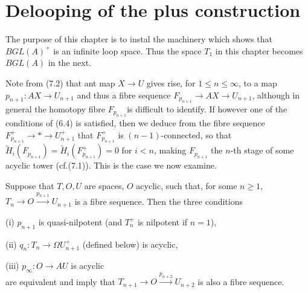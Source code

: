 \chapter{Delooping of the plus construction} %
\label{cha:10delooping_of_the_plus_construction}
The purpose of this chapter is to instal the machinery which shows that $BGL(A)^+$ is an infinite loop space. Thus the space $T_1$ in this chapter becomes $BGL(A)$ in the next.

Note from (7.2) that ant map $X\longrightarrow U$ gives rise, for $1\leqslant n \leqslant \infty$, to a map $p_{n+1}\colon  AX\longrightarrow U_{n+1}$ and thus a fibre sequence $F_{p_{n+1}}\longrightarrow AX \longrightarrow U_{n+1}$, although in general the homotopy fibre $F_{p_{n+1}}$is difficult to identify. If however one of the conditions of (6.4) is satisfied, then we deduce from the fibre sequence $F_{p_{n+1}}^+\longrightarrow * \longrightarrow U_{n+1}^+$ that $F_{p_{n+1}}^+$ is $(n-1)$-connected, so that $\widetilde{H}_i(F_{p_{n+1}})=\widetilde{H}_i(F_{p_{n+1}}^+)=0$ for $i< n$, making $F_{p_{n+1}}$ the $n$-th stage of some acyclic tower (cf.(7.1)). This is the case we now examine.
\begin{lemma}
  Suppose that $T,O,U$ are spaces, $O$ acyclic, such that, for some $n\geqslant 1$, $T_n\longrightarrow O {\overset{p_{n+1}}\longrightarrow} U_{n+1}$ is a fibre sequence. Then the three conditions
  
  (i) $p_{n+1}$ is quasi-nilpotent (and $T_n^+$ is nilpotent if $n=1$),
  
  (ii) $q_n\colon  T_n \longrightarrow \Omega U_{n+1}^+$ (defined below) is acyclic,
  
  (iii) $p_{\infty}\colon   O \longrightarrow AU$ is acyclic \\
are equivalent and imply that $T_{n+1} \longrightarrow O {\overset{p_{n+2}}\longrightarrow} U_{n+2}$ is also a fibre sequence.
\end{lemma}
